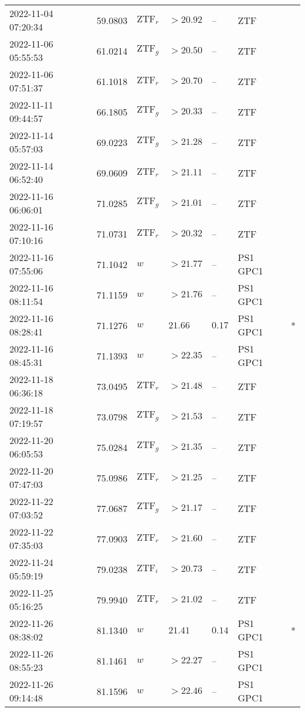 \documentclass{nature_plusfigure}
\begin{document}
\begin{supplement}
\begin{center}
\begin{longtable}{lllllll}
2022-11-04 07:20:34 & 59.0803 & $\mathrm{ZTF}_{r}$ & $>20.92$ & -- & ZTF &  \\ 
2022-11-06 05:55:53 & 61.0214 & $\mathrm{ZTF}_{g}$ & $>20.50$ & -- & ZTF &  \\ 
2022-11-06 07:51:37 & 61.1018 & $\mathrm{ZTF}_{r}$ & $>20.70$ & -- & ZTF &  \\ 
2022-11-11 09:44:57 & 66.1805 & $\mathrm{ZTF}_{g}$ & $>20.33$ & -- & ZTF &  \\ 
2022-11-14 05:57:03 & 69.0223 & $\mathrm{ZTF}_{g}$ & $>21.28$ & -- & ZTF &  \\ 
2022-11-14 06:52:40 & 69.0609 & $\mathrm{ZTF}_{r}$ & $>21.11$ & -- & ZTF &  \\ 
2022-11-16 06:06:01 & 71.0285 & $\mathrm{ZTF}_{g}$ & $>21.01$ & -- & ZTF &  \\ 
2022-11-16 07:10:16 & 71.0731 & $\mathrm{ZTF}_{r}$ & $>20.32$ & -- & ZTF &  \\ 
2022-11-16 07:55:06 & 71.1042 & $w$ & $>21.77$ & -- & PS1 GPC1 &  \\ 
2022-11-16 08:11:54 & 71.1159 & $w$ & $>21.76$ & -- & PS1 GPC1 &  \\ 
2022-11-16 08:28:41 & 71.1276 & $w$ & $21.66$ & $0.17$ & PS1 GPC1 & * \\ 
2022-11-16 08:45:31 & 71.1393 & $w$ & $>22.35$ & -- & PS1 GPC1 &  \\ 
2022-11-18 06:36:18 & 73.0495 & $\mathrm{ZTF}_{r}$ & $>21.48$ & -- & ZTF &  \\ 
2022-11-18 07:19:57 & 73.0798 & $\mathrm{ZTF}_{g}$ & $>21.53$ & -- & ZTF &  \\ 
2022-11-20 06:05:53 & 75.0284 & $\mathrm{ZTF}_{g}$ & $>21.35$ & -- & ZTF &  \\ 
2022-11-20 07:47:03 & 75.0986 & $\mathrm{ZTF}_{r}$ & $>21.25$ & -- & ZTF &  \\ 
2022-11-22 07:03:52 & 77.0687 & $\mathrm{ZTF}_{g}$ & $>21.17$ & -- & ZTF &  \\ 
2022-11-22 07:35:03 & 77.0903 & $\mathrm{ZTF}_{r}$ & $>21.60$ & -- & ZTF &  \\ 
2022-11-24 05:59:19 & 79.0238 & $\mathrm{ZTF}_{i}$ & $>20.73$ & -- & ZTF &  \\ 
2022-11-25 05:16:25 & 79.9940 & $\mathrm{ZTF}_{r}$ & $>21.02$ & -- & ZTF &  \\ 
2022-11-26 08:38:02 & 81.1340 & $w$ & $21.41$ & $0.14$ & PS1 GPC1 & * \\ 
2022-11-26 08:55:23 & 81.1461 & $w$ & $>22.27$ & -- & PS1 GPC1 &  \\ 
2022-11-26 09:14:48 & 81.1596 & $w$ & $>22.46$ & -- & PS1 GPC1 &  \\ 

\end{longtable}
\end{center}
\end{supplement}
\end{document}
